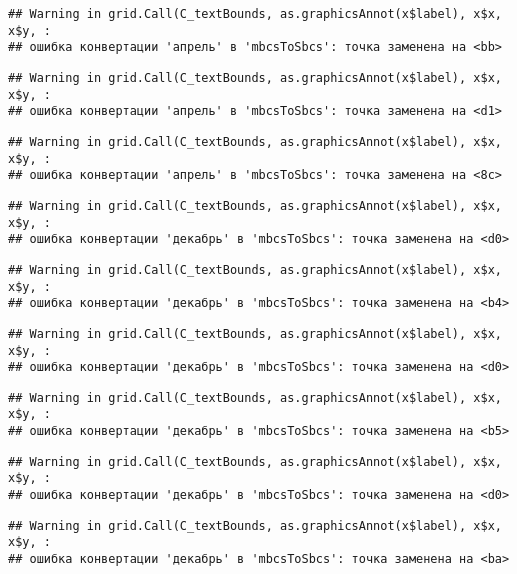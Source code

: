\documentclass[
]{article}
\begin{document}
\begin{verbatim}
## Warning in grid.Call(C_textBounds, as.graphicsAnnot(x$label), x$x, x$y, :
## ошибка конвертации 'апрель' в 'mbcsToSbcs': точка заменена на <bb>
\end{verbatim}

\begin{verbatim}
## Warning in grid.Call(C_textBounds, as.graphicsAnnot(x$label), x$x, x$y, :
## ошибка конвертации 'апрель' в 'mbcsToSbcs': точка заменена на <d1>
\end{verbatim}

\begin{verbatim}
## Warning in grid.Call(C_textBounds, as.graphicsAnnot(x$label), x$x, x$y, :
## ошибка конвертации 'апрель' в 'mbcsToSbcs': точка заменена на <8c>
\end{verbatim}

\begin{verbatim}
## Warning in grid.Call(C_textBounds, as.graphicsAnnot(x$label), x$x, x$y, :
## ошибка конвертации 'декабрь' в 'mbcsToSbcs': точка заменена на <d0>
\end{verbatim}

\begin{verbatim}
## Warning in grid.Call(C_textBounds, as.graphicsAnnot(x$label), x$x, x$y, :
## ошибка конвертации 'декабрь' в 'mbcsToSbcs': точка заменена на <b4>
\end{verbatim}

\begin{verbatim}
## Warning in grid.Call(C_textBounds, as.graphicsAnnot(x$label), x$x, x$y, :
## ошибка конвертации 'декабрь' в 'mbcsToSbcs': точка заменена на <d0>
\end{verbatim}

\begin{verbatim}
## Warning in grid.Call(C_textBounds, as.graphicsAnnot(x$label), x$x, x$y, :
## ошибка конвертации 'декабрь' в 'mbcsToSbcs': точка заменена на <b5>
\end{verbatim}

\begin{verbatim}
## Warning in grid.Call(C_textBounds, as.graphicsAnnot(x$label), x$x, x$y, :
## ошибка конвертации 'декабрь' в 'mbcsToSbcs': точка заменена на <d0>
\end{verbatim}

\begin{verbatim}
## Warning in grid.Call(C_textBounds, as.graphicsAnnot(x$label), x$x, x$y, :
## ошибка конвертации 'декабрь' в 'mbcsToSbcs': точка заменена на <ba>
\end{verbatim}
\end{document}
